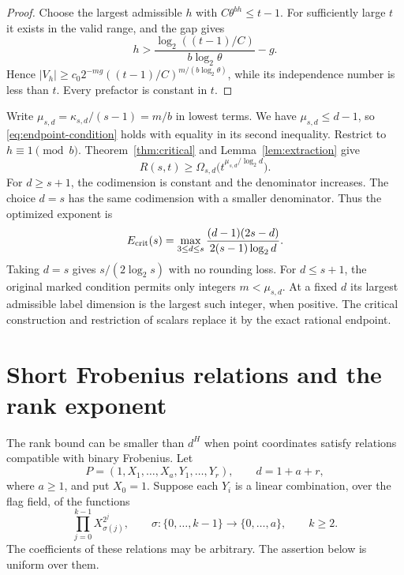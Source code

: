 \documentclass[11pt,a4paper]{article}
\theoremstyle{definition}
\theoremstyle{remark}
\numberwithin{equation}{section}
\begin{document}
\begin{proof}
Choose the largest admissible $h$ with $C\theta^{bh}\le t-1$. For sufficiently large $t$ it exists in the valid range, and the gap gives
\[
h>\frac{\log_2((t-1)/C)}{b\log_2\theta}-g.
\]
Hence $|V_h|\ge c_0 2^{-mg}((t-1)/C)^{m/(b\log_2\theta)}$, while its independence number is less than $t$. Every prefactor is constant in $t$.
\end{proof}

Write $\mu_{s,d}=\kappa_{s,d}/(s-1)=m/b$ in lowest terms. We have $\mu_{s,d}\le d-1$, so \eqref{eq:endpoint-condition} holds with equality in its second inequality. Restrict to $h\equiv1\pmod b$. Theorem~\ref{thm:critical} and Lemma~\ref{lem:extraction} give
\begin{equation}\label{eq:critical-exponent}
R(s,t)\ge\Omega_{s,d}\bigl(t^{\mu_{s,d}/\log_2d}\bigr).
\end{equation}
For $d\ge s+1$, the codimension is constant and the denominator increases. The choice $d=s$ has the same codimension with a smaller denominator. Thus the optimized exponent is
\begin{equation}\label{eq:Ecrit}
E_{\rm crit}(s)=\max_{3\le d\le s}
\frac{(d-1)(2s-d)}{2(s-1)\log_2d}.
\end{equation}
Taking $d=s$ gives $s/(2\log_2s)$ with no rounding loss. For $d\le s+1$, the original marked condition permits only integers $m<\mu_{s,d}$. At a fixed $d$ its largest admissible label dimension is the largest such integer, when positive. The critical construction and restriction of scalars replace it by the exact rational endpoint.

\section{Short Frobenius relations and the rank exponent}\label{sec:words}
The rank bound can be smaller than $d^H$ when point coordinates satisfy relations compatible with binary Frobenius. Let
\[
P=(1,X_1,\ldots,X_a,Y_1,\ldots,Y_r),\qquad d=1+a+r,
\]
where $a\ge1$, and put $X_0=1$. Suppose each $Y_i$ is a linear combination, over the flag field, of the functions
\begin{equation}\label{eq:short-relation}
\prod_{j=0}^{k-1}X_{\sigma(j)}^{2^j},\qquad \sigma:\{0,\ldots,k-1\}\longrightarrow\{0,\ldots,a\},\qquad k\ge2.
\end{equation}
The coefficients of these relations may be arbitrary. The assertion below is uniform over them.
\end{document}

